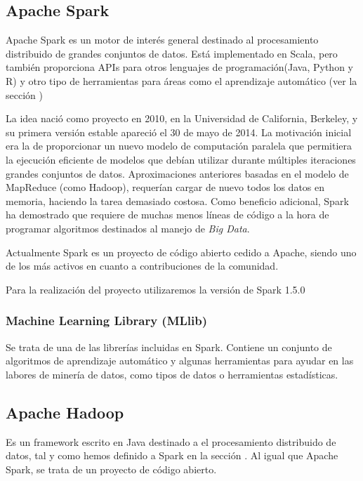 \subsection{Apache Spark}\label{sec:DefSpark}

Apache Spark es un motor de interés general destinado al procesamiento distribuido de grandes conjuntos de datos. Está implementado en Scala, pero también proporciona APIs para otros lenguajes de programación(Java, Python y R) y otro tipo de herramientas para áreas como el aprendizaje automático (ver la sección ) \cite{SparkDoc}

La idea nació como proyecto en 2010, en la Universidad de California, Berkeley, y su primera versión estable apareció el 30 de mayo de 2014. La motivación inicial era la de proporcionar un nuevo modelo de computación paralela que permitiera la ejecución eficiente de modelos que debían utilizar durante múltiples iteraciones grandes conjuntos de datos. Aproximaciones anteriores basadas en el modelo de MapReduce (como Hadoop), requerían cargar de nuevo todos los datos en memoria, haciendo la tarea demasiado costosa\cite{SparkPaper}. Como beneficio adicional, Spark ha demostrado que requiere de muchas menos líneas de código a la hora de programar algoritmos destinados al manejo de \textit{Big Data}.


Actualmente Spark es un proyecto de código abierto cedido a Apache, siendo uno de los más activos en cuanto a contribuciones de la comunidad. \cite{ApacheContributions}

Para la realización del proyecto utilizaremos la versión de Spark 1.5.0

\subsubsection{Machine Learning Library (MLlib)}\label{MLib}

Se trata de una de las librerías incluidas en Spark. Contiene un conjunto de algoritmos de aprendizaje automático y algunas herramientas para ayudar en las labores de minería de datos, como tipos de datos o herramientas estadísticas.  

\subsection{Apache Hadoop}
Es un framework escrito en Java destinado a el procesamiento distribuido de datos, tal y como hemos definido a Spark en la sección  . Al igual que Apache Spark, se trata de un proyecto de código abierto. \cite{HadoopPage}

